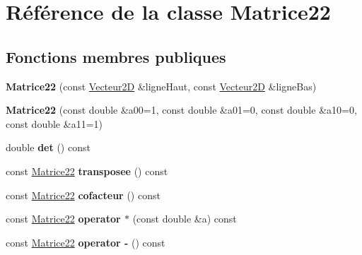 \hypertarget{class_matrice22}{}\section{Référence de la classe Matrice22}
\label{class_matrice22}
\subsection*{Fonctions membres publiques}
\begin{DoxyCompactItemize}
\item 
\mbox{\label{class_matrice22_a05473e81b46ebd75f840a947019b4814}} 
{\bfseries Matrice22} (const \mbox{\hyperlink{class_vecteur2_d}{Vecteur2D}} \&ligne\+Haut, const \mbox{\hyperlink{class_vecteur2_d}{Vecteur2D}} \&ligne\+Bas)
\item 
\mbox{\label{class_matrice22_a6013299afa7055f8b9b7be40274aef3f}} 
{\bfseries Matrice22} (const double \&a00=1, const double \&a01=0, const double \&a10=0, const double \&a11=1)
\item 
\mbox{\label{class_matrice22_a7f370bc2352837f9ee5e236bd645edcf}} 
double {\bfseries det} () const
\item 
\mbox{\label{class_matrice22_afe136f8083aee3568432c340aec444a3}} 
const \mbox{\hyperlink{class_matrice22}{Matrice22}} {\bfseries transposee} () const
\item 
\mbox{\label{class_matrice22_aa0e87a3bd385b90300ff0b3cdb495bd5}} 
const \mbox{\hyperlink{class_matrice22}{Matrice22}} {\bfseries cofacteur} () const
\item 
\mbox{\label{class_matrice22_ad90563f7dfd2d7bcb928ae3e8c3390fb}} 
const \mbox{\hyperlink{class_matrice22}{Matrice22}} {\bfseries operator $\ast$} (const double \&a) const
\item 
\mbox{\label{class_matrice22_a25a230bb5e41aaf17cb564fe79276327}} 
const \mbox{\hyperlink{class_matrice22}{Matrice22}} {\bfseries operator -\/} () const
\item 
\mbox{\label{class_matrice22_a28155e014afa1b26548eda5026c986e1}} 

\end{DoxyCompactItemize}
